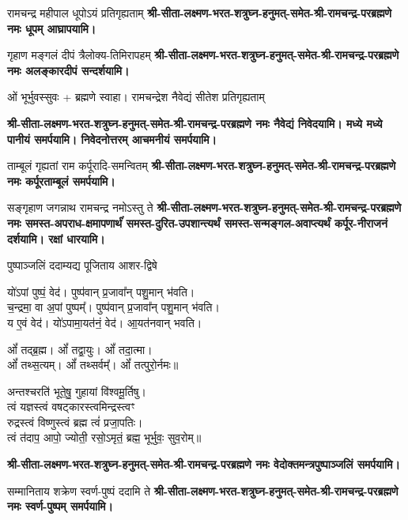 \begin{center}
\renewcommand{\devAya}{श्री-सीता-लक्ष्मण-भरत-शत्रुघ्न-हनुमत्-समेत-श्री-रामचन्द्र-परब्रह्मणे नमः}



{रामचन्द्र महीपाल धूपोऽयं प्रतिगृह्यताम्}
\textbf{\devAya{} धूपम् आघ्रापयामि।}

{गृहाण मङ्गलं दीपं त्रैलोक्य-तिमिरापहम्}
\textbf{\devAya{} अलङ्कारदीपं सन्दर्शयामि।}

ओं भूर्भुवस्सुवः + ब्रह्मणे स्वाहा।
{रामचन्द्रेश नैवेद्यं सीतेश प्रतिगृह्यताम्}

\textbf{\devAya{} नैवेद्यं निवेदयामि। मध्ये मध्ये पानीयं समर्पयामि। निवेदनोत्तरम् आचमनीयं समर्पयामि।}

{ताम्बूलं गृह्यतां राम कर्पूरादि-समन्वितम्}
\textbf{\devAya{} कर्पूरताम्बूलं समर्पयामि।}

{सङ्गृहाण जगन्नाथ रामचन्द्र नमोऽस्तु ते}
\textbf{\devAya{} समस्त-अपराध-क्षमापणार्थंं समस्त-दुरित-उपशान्त्यर्थं समस्त-सन्मङ्गल-अवाप्त्यर्थं कर्पूर-नीराजनं दर्शयामि। रक्षां धारयामि।}


{पुष्पाञ्जलिं ददाम्यद्य पूजिताय आशर-द्विषे}

यो॑ऽपां पुष्पं॒ वेद॑। पुष्प॑वान् प्र॒जावा᳚न् पशु॒मान् भ॑वति।\\
च॒न्द्रमा॒ वा अ॒पां पुष्पम्᳚। पुष्प॑वान् प्र॒जावा᳚न् पशु॒मान् भ॑वति।\\
य ए॒वं वेद॑। यो॑ऽपामा॒यत॑नं॒ वेद॑। आ॒यत॑नवान् भवति।\medskip

ओं᳚ तद्ब्र॒ह्म। ओं᳚ तद्वा॒युः। ओं᳚ तदा॒त्मा।\\ ओं᳚ तथ्स॒त्यम्‌।
ओं᳚ तथ्सर्वम्᳚‌। ओं᳚ तत्पुरो॒र्नमः॥\medskip

अन्तश्चरति॑ भूते॒षु॒ गुहायां वि॑श्वमू॒र्तिषु। \\
त्वं यज्ञस्त्वं वषट्कारस्त्वमिन्द्रस्त्वꣳ\\ रुद्रस्त्वं विष्णुस्त्वं ब्रह्म त्वं॑ प्रजा॒पतिः। \\
त्वं त॑दाप॒ आपो॒ ज्योती॒ रसो॒ऽमृतं॒ ब्रह्म॒ भूर्भुवः॒ सुव॒रोम्‌॥

\textbf{\devAya{} वेदोक्तमन्त्रपुष्पाञ्जलिं समर्पयामि।}

{सम्मानिताय शक्रेण स्वर्ण-पुष्पं ददामि ते}
\textbf{\devAya{} स्वर्ण-पुष्पम् समर्पयामि।}


\end{center}
